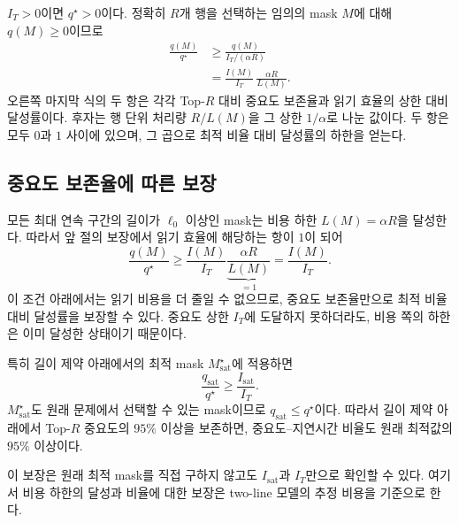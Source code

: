 $I_T>0$이면 $q^\star>0$이다. 정확히 $R$개 행을 선택하는 임의의 mask $M$에 대해 $q(M)\ge0$이므로
\[
\boxed{
\begin{aligned}
\frac{q(M)}{q^\star}
&\ge\frac{q(M)}{I_T/(\alpha R)}\\
&=\frac{I(M)}{I_T}\,
\frac{\alpha R}{L(M)}.
\end{aligned}
}
\]
오른쪽 마지막 식의 두 항은 각각 Top-$R$ 대비 중요도 보존율과 읽기 효율의 상한 대비 달성률이다. 후자는 행 단위 처리량 $R/L(M)$을 그 상한 $1/\alpha$로 나눈 값이다. 두 항은 모두 $0$과 $1$ 사이에 있으며, 그 곱으로 최적 비율 대비 달성률의 하한을 얻는다.

\subsection{중요도 보존율에 따른 보장}\label{sec:guarantee-importance}

모든 최대 연속 구간의 길이가 $\ell_0$ 이상인 mask는 비용 하한 $L(M)=\alpha R$을 달성한다. 따라서 앞 절의 보장에서 읽기 효율에 해당하는 항이 $1$이 되어
\[
\frac{q(M)}{q^\star}
\ge
\frac{I(M)}{I_T}
\underbrace{\frac{\alpha R}{L(M)}}_{=1}
=\frac{I(M)}{I_T}.
\]
이 조건 아래에서는 읽기 비용을 더 줄일 수 없으므로, 중요도 보존율만으로 최적 비율 대비 달성률을 보장할 수 있다. 중요도 상한 $I_T$에 도달하지 못하더라도, 비용 쪽의 하한은 이미 달성한 상태이기 때문이다.

특히 길이 제약 아래에서의 최적 mask $M_{\mathrm{sat}}^\star$에 적용하면
\[
\boxed{
\frac{q_{\mathrm{sat}}}{q^\star}
\ge
\frac{I_{\mathrm{sat}}}{I_T}.
}
\]
$M_{\mathrm{sat}}^\star$도 원래 문제에서 선택할 수 있는 mask이므로 $q_{\mathrm{sat}}\le q^\star$이다. 따라서 길이 제약 아래에서 Top-$R$ 중요도의 $95\%$ 이상을 보존하면, 중요도--지연시간 비율도 원래 최적값의 $95\%$ 이상이다.

이 보장은 원래 최적 mask를 직접 구하지 않고도 $I_{\mathrm{sat}}$과 $I_T$만으로 확인할 수 있다. 여기서 비용 하한의 달성과 비율에 대한 보장은 two-line 모델의 추정 비용을 기준으로 한다.
